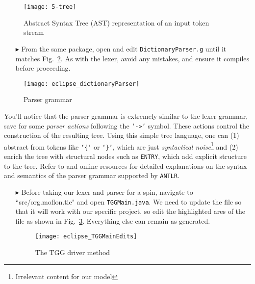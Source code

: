 \begin{figure}[htp]
\begin{center}
 \texttt{[image: 5-tree]}
  \caption{Abstract Syntax Tree (AST) representation of an input token stream}
  \label{eclipse:dictLexer}
\end{center}
\end{figure}

\begin{itemize}

\item[$\blacktriangleright$] From the same package, open and edit \texttt{DictionaryParser.g} until it matches Fig.~\ref{eclipse:dictParser}. As with the lexer,
avoid any mistakes, and ensure it compiles before proceeding.

\end{itemize}

\begin{figure}[!htbp]
\begin{center}
 \texttt{[image: eclipse\_dictionaryParser]}
  \caption{Parser grammar}
  \label{eclipse:dictParser}
\end{center}
\end{figure}

You'll notice that the parser grammar is extremely similar to the lexer grammar, save for some \emph{parser actions} following the \texttt{`->'} symbol. These
actions control the construction of the resulting tree. Using this simple tree language, one can (1) abstract from tokens like \texttt{`\{'} or \texttt{`\}'},
which are just \emph{syntactical noise}\footnote{Irrelevant content for our model} and (2) enrich the tree with structural nodes such as \texttt{ENTRY}, which
add explicit structure to the tree. Refer to \cite{ANTLR} and online resources for detailed explanations on the syntax and semantics of the parser grammar
supported by \texttt{ANTLR}.

\newpage

\begin{itemize}

\item[$\blacktriangleright$] Before taking our lexer and parser for a spin, navigate to \\ ``src/org.moflon.tie" and open \texttt{TGGMain.java}. We need to
update the file so that it will work with our specific project, so edit the highlighted ares of the file as shown in Fig.~\ref{eclipse:defaultTGGMain}.
Everything else can remain as generated.

\vspace{0.5cm}

\begin{figure}[!htbp]
\begin{center}
 \texttt{[image: eclipse\_TGGMainEdits]}
  \caption{The TGG driver method}
  \label{eclipse:defaultTGGMain}
\end{center}
\end{figure}

\end{itemize}


